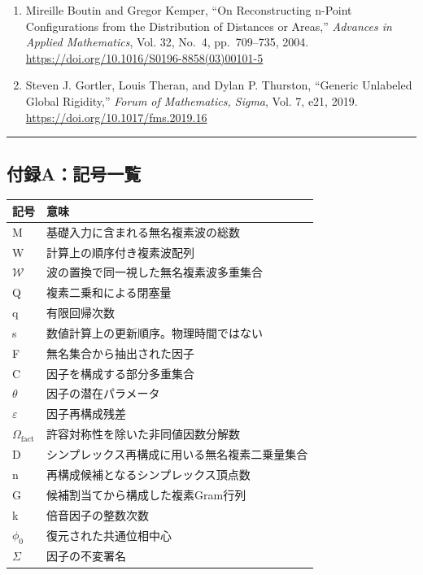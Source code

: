 \documentclass[
  a4paper,
]{ltjsarticle}
\newcounter{none} %
\begin{document}
\begin{enumerate}
\def\labelenumi{\arabic{enumi}.}
\item
  Mireille Boutin and Gregor Kemper, ``On Reconstructing n-Point
  Configurations from the Distribution of Distances or Areas,''
  \emph{Advances in Applied Mathematics}, Vol. 32, No.~4, pp.~709--735,
  2004. \url{https://doi.org/10.1016/S0196-8858(03)00101-5}
\item
  Steven J. Gortler, Louis Theran, and Dylan P. Thurston, ``Generic
  Unlabeled Global Rigidity,'' \emph{Forum of Mathematics, Sigma}, Vol.
  7, e21, 2019. \url{https://doi.org/10.1017/fms.2019.16}
\end{enumerate}

\begin{center}\rule{0.5\linewidth}{0.5pt}\end{center}

\subsection{付録A：記号一覧}\label{ux4ed8ux9332aux8a18ux53f7ux4e00ux89a7}

{\def\LTcaptype{none} %
\begin{longtable}[]{@{}ll@{}}
\toprule\noalign{}
記号 & 意味 \\
\midrule\noalign{}
\endhead
\bottomrule\noalign{}
\endlastfoot
M & 基礎入力に含まれる無名複素波の総数 \\
W & 計算上の順序付き複素波配列 \\
\(\mathcal{W}\) & 波の置換で同一視した無名複素波多重集合 \\
Q & 複素二乗和による閉塞量 \\
q & 有限回帰次数 \\
s & 数値計算上の更新順序。物理時間ではない \\
F & 無名集合から抽出された因子 \\
C & 因子を構成する部分多重集合 \\
\(\theta\) & 因子の潜在パラメータ \\
\(\varepsilon\) & 因子再構成残差 \\
\(\Omega_{\mathrm{fact}}\) & 許容対称性を除いた非同値因数分解数 \\
D & シンプレックス再構成に用いる無名複素二乗量集合 \\
n & 再構成候補となるシンプレックス頂点数 \\
G & 候補割当てから構成した複素Gram行列 \\
k & 倍音因子の整数次数 \\
\(\phi_0\) & 復元された共通位相中心 \\
\(\Sigma\) & 因子の不変署名 \\
\end{longtable}
}
\end{document}
